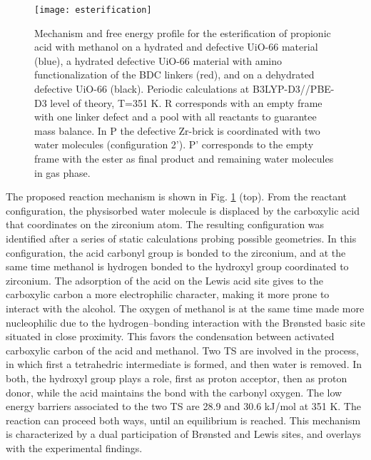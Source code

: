 \begin{figure}[!htbp]
	\centering
	\texttt{[image: esterification]}
	\caption{Mechanism and free energy profile for the esterification of propionic acid with methanol on a hydrated and defective UiO-66 material (blue), a hydrated defective UiO-66 material with amino functionalization of the BDC linkers (red), and on a dehydrated defective UiO-66 (black). Periodic calculations at B3LYP-D3//PBE-D3 level of theory, T=351 K. R corresponds with an empty frame with one linker defect and a pool with all reactants to guarantee mass balance. In P the defective Zr-brick is coordinated with two water molecules (configuration 2’). P’ corresponds to the empty frame with the ester as final product and remaining water molecules in gas phase.}
	\label{fig:esterification}
\end{figure}
\npar
The proposed reaction mechanism is shown in Fig. \ref{fig:esterification} (top). From the reactant configuration, the physisorbed water molecule is displaced by the carboxylic acid that coordinates on the zirconium atom. The resulting configuration was identified after a series of static calculations probing possible geometries. In this configuration, the acid carbonyl group is bonded to the zirconium, and at the same time methanol is hydrogen bonded to the hydroxyl group coordinated to zirconium. The adsorption of the acid on the Lewis acid site gives to the carboxylic carbon a more electrophilic character, making it more prone to interact with the alcohol. The oxygen of methanol is at the same time made more nucleophilic due to the hydrogen--bonding interaction with the Br\o{}nsted basic site situated in close proximity. This favors the condensation between activated carboxylic carbon of the acid and methanol. Two TS are involved in the process, in which first a tetrahedric intermediate is formed, and then water is removed. In both, the hydroxyl group plays a role, first as proton acceptor, then as proton donor, while the acid maintains the bond with the carbonyl oxygen. The low energy barriers associated to the two TS are 28.9 and 30.6 kJ/mol at 351 K. The reaction can proceed both ways, until an equilibrium is reached. This mechanism is characterized by a dual participation of Br\o{}nsted and Lewis sites, and overlays with the experimental findings.
\npar

